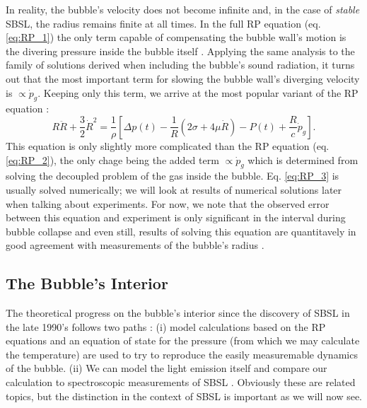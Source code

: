 \documentclass[rmp,aps,nofootinbib,superscriptaddress,floatfix]{revtex4-2}
\begin{document}
In reality, the bubble's velocity does not become infinite and, in the case of \emph{stable} SBSL, the radius remains finite at all times. In the full RP equation (eq. \ref{eq:RP_1}) the only term capable of compensating the bubble wall's motion is the divering pressure inside the bubble itself \cite{brenner2002single}. Applying the same analysis to the family of solutions derived when including the bubble's sound radiation, it turns out that the most important term for slowing the bubble wall's diverging velocity is $\propto\dot{p}_g$. Keeping only this term, we arrive at the most popular variant of the RP equation \cite{lofstedt1995sonoluminescing,barber1997defining}:
\begin{equation}
    R\ddot{R}+\frac{3}{2}\dot{R}^2 = \frac{1}{\rho} \left[ \Delta p(t)-\frac{1}{R}\left( 2\sigma+4\mu \dot{R} \right)-P(t) +\frac{R}{c} \dot{p}_g \right].
    \label{eq:RP_3}
\end{equation}
This equation is only slightly more complicated than the RP equation (eq. \ref{eq:RP_2}), the only chage being the added term $\propto \dot{p}_g$ which is determined from solving the decoupled problem of the gas inside the bubble. Eq. \ref{eq:RP_3} is usually solved numerically; we will look at results of numerical solutions later when talking about experiments. For now, we note that the observed error between this equation and experiment is only significant in the interval during bubble collapse and even still, results of solving this equation are quantitavely in good agreement with measurements of the bubble's radius \cite{brenner2002single}. 


\subsection{The Bubble's Interior}
The theoretical progress on the bubble's interior since the discovery of SBSL in the late 1990's \cite{gaitan1992sonoluminescence} follows two paths \cite{brenner2002single,suslick2008inside,yasui2018acoustic}: (i) model calculations based on the RP equations and an equation of state for the pressure (from which we may calculate the temperature) are used to try to reproduce the easily measuremable dynamics of the bubble. (ii) We can model the light emission itself and compare our calculation to spectroscopic measurements of SBSL \cite{}. Obviously these are related topics, but the distinction in the context of SBSL is important as we will now see.
\end{document}
